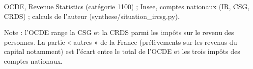 OCDE, Revenue Statistics (catégorie 1100) ; Insee, comptes nationaux (IR, CSG, CRDS) ; calculs de l'auteur (synthese/situation\_ircsg.py).\par Note : l'OCDE range la CSG et la CRDS parmi les impôts sur le revenu des personnes. La partie « autres » de la France (prélèvements sur les revenus du capital notamment) est l'écart entre le total de l'OCDE et les trois impôts des comptes nationaux.
